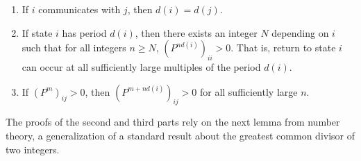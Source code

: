 \documentclass[12pt]{article}
\begin{document}
\begin{proposition}
    \begin{enumerate}
        \item
            If \( i \) communicates with \( j \), then \( d(i) = d(j) \).
        \item
            If state \( i \) has period \( d(i) \), then there exists an
            integer \( N \) depending on \( i \) such that for all
            integers \( n \ge N \), \( (P^{n d(i)})_{ii} > 0 \).  That
            is, return to state \( i \) can occur at all sufficiently
            large multiples of the period \( d(i) \).
        \item
            If \( (P^m)_{ij} >0 \), then \( (P^{m + nd(i)})_{ij} > 0 \)
            for all sufficiently large \( n \).
    \end{enumerate}
\end{proposition}

\begin{remark}
    The proofs of the second and third parts rely on the next lemma from
    number theory, a generalization of a standard result about the
    greatest common divisor of two integers.
\end{remark}
\end{document}

